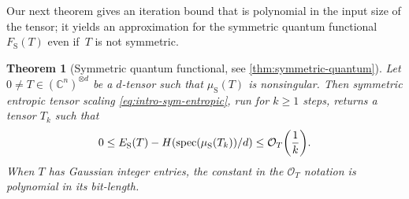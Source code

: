 \documentclass[11pt,letterpaper]{article}
\newtheorem{theorem}{Theorem}[section]
\numberwithin{equation}{section}
\newcommand{\CC}{\mathbb{C}}
\newcommand{\qfunc}{F}
\newcommand{\logqfunc}{E}
\DeclareMathOperator{\spec}{spec}
\DeclareMathOperator{\Sym}{S}
\begin{document}
Our next theorem gives an iteration bound that is polynomial in the input size of the tensor;
it yields an approximation for the symmetric quantum functional~$\qfunc_{\Sym}(T)$ even if~$T$ is not symmetric.

\begin{theorem}[Symmetric quantum functional, see \cref{thm:symmetric-quantum}]\label{thm:intro-symmetric-quantum-functional}
    Let $0\neq T\in (\CC^n)^{\otimes d}$ be a $d$-tensor such that $\mu_{\Sym}(T)$ is nonsingular.
	Then symmetric entropic tensor scaling \eqref{eq:intro-sym-entropic}, run for $k\geq1$ steps, returns a tensor $T_k$ such that
    \[
        0 \le \logqfunc_{\Sym}(T) - H(\spec(\mu_{\Sym}(T_k))/d) \leq \mathcal O_T\mleft( \frac1k \mright).
    \]
    When $T$ has Gaussian integer entries, the constant in the $\mathcal O_T$ notation is polynomial in its bit-length.
\end{theorem}



\end{document}
